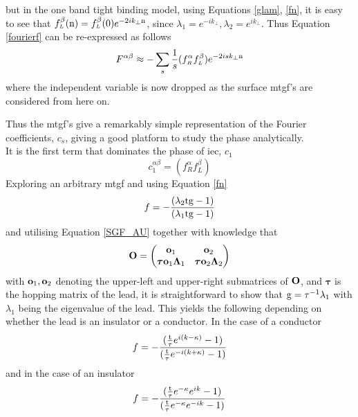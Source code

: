 \documentclass[a4paper, 12pt]{article}
\begin{document}
but in the one band tight binding model, using Equations \eqref{glam}, \eqref{fn}, it is easy to see that $f_{\scriptscriptstyle L}^{\beta}({\rm n}) = f_{\scriptscriptstyle L}^{\beta}({\rm 0})e^{-2ik_\perp \rm n}$, since $\lambda_1 = e^{-ik_\perp}, \lambda_2 = e^{ik_\perp}$. Thus Equation \eqref{fourierf} can be re-expressed as follows
\begin{equation}\label{fs}
	F^{\alpha\beta} \approx -\sum_s \frac{1}{s}(f_{\scriptscriptstyle R}^\alpha f_{\scriptscriptstyle L}^\beta)e^{-2isk_\perp {\rm n}}
\end{equation}
where the independent variable is now dropped as the surface \gls{mtgf}'s are considered from here on.
\par Thus the \gls{mtgf}'s give a remarkably simple representation of the Fourier coefficients, $c_s$, giving a good platform to study the phase analytically.
\\[2mm] It is the first term that dominates the phase of \gls{iec}, $c_1$
\begin{equation}
	c_1^{\alpha\beta} = (f_{\scriptscriptstyle R}^\alpha f_{\scriptscriptstyle L}^\beta)
\end{equation}
Exploring an arbitrary \gls{mtgf} and using Equation \eqref{fn}
\begin{equation}
	f = -\frac{(\lambda_2{\rm t g} - 1)}{(\lambda_1 {\rm t g} - 1)}
\end{equation}
and utilising Equation \eqref{SGF_AU} together with knowledge that 
\begin{equation}
	{\bf O} = \begin{pmatrix} {\bf o}_1&{\bf o}_2\\{\bf \bm \tau o}_1\bm\Lambda_1&{\bf \bm \tau o}_2\bm\Lambda_2 \end{pmatrix}
\end{equation}
with ${\bf o}_1, {\bf o}_2$ denoting the upper-left and upper-right submatrices of $\bf O$, and $\bm \tau$ is the hopping matrix of the lead,
it is straightforward to show that 
$\rm g =\tau^{-1}\lambda_1$ with $\lambda_1$ being the eigenvalue of the lead.
This yields the following depending on whether the lead is an insulator or a conductor. In the case of a conductor
\begin{equation}\label{conductor}
	f = -\frac{(\frac{\rm t}{\tau}e^{i(k - \kappa)}-1)}{(\frac{\rm t}{\tau}e^{-i(k +\kappa)}-1)}
\end{equation}
and in the case of an insulator
\begin{equation}\label{insulator}
	f = -\frac{(\frac{\rm t}{\tau}e^{-\kappa} e^{ ik}-1)}{(\frac{\rm t}{\tau}e^{-\kappa} e^{-ik}-1)}
\end{equation}
\end{document}
